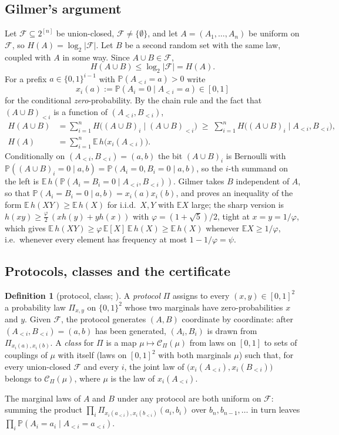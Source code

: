 \documentclass[11pt,a4paper]{article}
\theoremstyle{definition}
\newtheorem{definition}[theorem]{Definition}
\theoremstyle{remark}
\newcommand{\E}{\mathbb{E}}
\newcommand{\Prob}{\mathbb{P}}
\newcommand{\F}{\mathcal{F}}
\newcommand{\cC}{\mathcal{C}}
\newcommand{\ent}{h}
\begin{document}
\subsection{Gilmer's argument}
Let $\F\subseteq2^{[n]}$ be union-closed, $\F\ne\{\emptyset\}$, and let $A=(A_1,\dots,A_n)$ be uniform on $\F$, so $H(A)=\log_2|\F|$. Let $B$ be a second random set with the same law, coupled with $A$ in some way. Since $A\cup B\in\F$,
\begin{equation}\label{eq:union}
H(A\cup B)\le\log_2|\F|=H(A).
\end{equation}
For a prefix $a\in\{0,1\}^{i-1}$ with $\Prob(A_{<i}=a)>0$ write
\[x_i(a):=\Prob(A_i=0\mid A_{<i}=a)\in[0,1]\]
for the conditional \emph{zero}-probability. By the chain rule and the fact that $(A\cup B)_{<i}$ is a function of $(A_{<i},B_{<i})$,
\begin{equation}\label{eq:chain}
\begin{aligned}
H(A\cup B)&=\sum_{i=1}^nH\big((A\cup B)_i\mid(A\cup B)_{<i}\big)\;\ge\;\sum_{i=1}^nH\big((A\cup B)_i\mid A_{<i},B_{<i}\big),\\
H(A)&=\sum_{i=1}^n\E\,\ent\big(x_i(A_{<i})\big).
\end{aligned}
\end{equation}
Conditionally on $(A_{<i},B_{<i})=(a,b)$ the bit $(A\cup B)_i$ is Bernoulli with $\Prob((A\cup B)_i=0\mid a,b)=\Prob(A_i=0,B_i=0\mid a,b)$, so the $i$-th summand on the left is $\E\,\ent(\Prob(A_i=B_i=0\mid A_{<i},B_{<i}))$. Gilmer takes $B$ independent of $A$, so that $\Prob(A_i=B_i=0\mid a,b)=x_i(a)x_i(b)$, and proves an inequality of the form $\E\,\ent(XY)\ge\E\,\ent(X)$ for i.i.d.\ $X,Y$ with $\E X$ large; the sharp version \cite{AHS,CL,Sawin,Pebody} is $\ent(xy)\ge\frac{\varphi}2\,(x\ent(y)+y\ent(x))$ with $\varphi=(1+\sqrt5)/2$, tight at $x=y=1/\varphi$, which gives $\E\,\ent(XY)\ge\varphi\,\E[X]\,\E\,\ent(X)\ge\E\,\ent(X)$ whenever $\E X\ge1/\varphi$, i.e.\ whenever every element has frequency at most $1-1/\varphi=\psi$.

\subsection{Protocols, classes and the certificate}
\begin{definition}[protocol, class; \cite{Liu}]\label{def:protocol}
A \emph{protocol} $\Pi$ assigns to every $(x,y)\in[0,1]^2$ a probability law $\Pi_{x,y}$ on $\{0,1\}^2$ whose two marginals have zero-probabilities $x$ and $y$. Given $\F$, the protocol generates $(A,B)$ coordinate by coordinate: after $(A_{<i},B_{<i})=(a,b)$ has been generated, $(A_i,B_i)$ is drawn from $\Pi_{x_i(a),x_i(b)}$. A \emph{class} for $\Pi$ is a map $\mu\mapsto\cC_\Pi(\mu)$ from laws on $[0,1]$ to sets of couplings of $\mu$ with itself (laws on $[0,1]^2$ with both marginals $\mu$) such that, for every union-closed $\F$ and every $i$, the joint law of $\big(x_i(A_{<i}),x_i(B_{<i})\big)$ belongs to $\cC_\Pi(\mu)$, where $\mu$ is the law of $x_i(A_{<i})$.
\end{definition}
The marginal laws of $A$ and $B$ under any protocol are both uniform on $\F$: summing the product $\prod_i\Pi_{x_i(a_{<i}),x_i(b_{<i})}(a_i,b_i)$ over $b_n,b_{n-1},\dots$ in turn leaves $\prod_i\Prob(A_i=a_i\mid A_{<i}=a_{<i})$.
\end{document}
